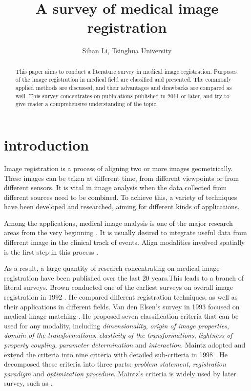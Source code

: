\documentclass{IEEEtran}
\title{A survey of medical image registration}
\author{Sihan Li, Tsinghua University}
\begin{document}
  \maketitle

  \begin{abstract}
    This paper aims to conduct a literature survey in medical image registration. Purposes of the image registration in medical field are classified and presented. The commonly applied methods are discussed, and their advantages and drawbacks are compared as well. This survey concentrates on publications published in 2011 or later, and try to give reader a comprehensive understanding of the topic.
  \end{abstract}

  \section{introduction}

  Image registration is a process of aligning two or more images geometrically. These images can be taken at different time, from different viewpoints or from different sensors. It is vital in image analysis when the data collected from different sources need to be combined. To achieve this, a variety of techniques have been developed and researched, aiming for different kinds of applications. \cite{brown1992survey, zitova2003image}

  Among the applications, medical image analysis is one of the major research areas from the very beginning \cite{brown1992survey}. It is usually desired to integrate useful data from different image in the clinical track of events. Align modalities involved spatially is the first step in this process \cite{maintz1998survey}.

  As a result, a large quantity of research concentrating on medical image registration have been published over the last 20 years.This leads to a branch of literal surveys. Brown conducted one of the earliest surveys on overall image registration in 1992 \cite{brown1992survey}. He compared different registration techniques, as well as their applications in different fields. Van den Elsen's survey in 1993 focused on medical image matching \cite{van1993medical}. He proposed seven classification criteria that can be used for any modality, including \emph{dimensionality}, \emph{origin of image properties}, \emph{domain of the transformations}, \emph{elasticity of the transformations}, \emph{tightness of property coupling}, \emph{parameter determination} and \emph{interaction}. Maintz adopted and extend the criteria into nine criteria with detailed sub-criteria in 1998 \cite{maintz1998survey}. He decomposed these criteria into three parts: \emph{problem statement}, \emph{registration paradigm} and \emph{optimization procedure}. Maintz's criteria is widely used by later survey, such as \cite{hill2001medical, sotiras2013deformable, mani2013survey, oliveira2014medical}.
\end{document}
